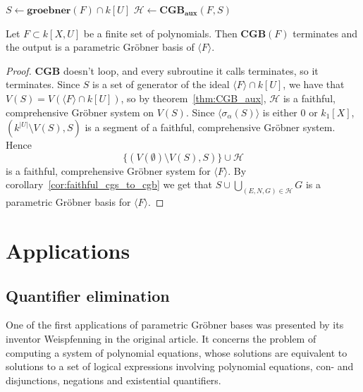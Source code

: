 \documentclass[a4paper, 12pt]{article}
\theoremstyle{changedot}
\theoremstyle{changedotbreak}
\theoremstyle{nonumberplain}
\newtheorem{proof}{Proof}
\begin{document}
\begin{algorithm}
  \caption{$\mathbf{CGB}$}
  $S \gets \mathbf{groebner}(F) \cap k[U]$\;
  $\mathcal H \gets \mathbf{CGB_{aux}}(F, S)$\;
  \;
\end{algorithm}
\begin{theorem}
  Let $F \subset k[X, U]$ be a finite set of polynomials. Then $\mathbf{CGB}(F)$ terminates and the output is a parametric Gröbner basis of $\langle F \rangle$.
\end{theorem}
\begin{proof}
  $\mathbf{CGB}$ doesn't loop, and every subroutine it calls terminates, so it terminates. Since $S$ is a set of generator of the ideal $\langle F \rangle \cap k[U]$, we have that $V(S) = V(\langle F \rangle \cap k[U])$, so by theorem~\ref{thm:CGB_aux}, $\mathcal H$ is a faithful, comprehensive Gröbner system on $V(S)$. Since $\langle \sigma_{\alpha}(S) \rangle$ is either 0 or $k_{1}[X]$, $(k^{|U|} \setminus V(S), S)$ is a segment of a faithful, comprehensive Gröbner system. Hence \[\{(V(\emptyset) \setminus V(S), S)\} \cup \mathcal H\] is a faithful, comprehensive Gröbner system for $\langle F \rangle$. By corollary~\ref{cor:faithful_cgs_to_cgb} we get that $S \cup \bigcup_{(E, N, G) \in \mathcal H} G$ is a parametric Gröbner basis for $\langle F \rangle$.
\end{proof}










\section{Applications}

\subsection{Quantifier elimination}
One of the first applications of parametric Gröbner bases was presented by its inventor Weispfenning \cite{Weispfenning} in the original article. It concerns the problem of computing a system of polynomial equations, whose solutions are equivalent to solutions to a set of logical expressions involving polynomial equations, con- and disjunctions, negations and existential quantifiers.
\end{document}
